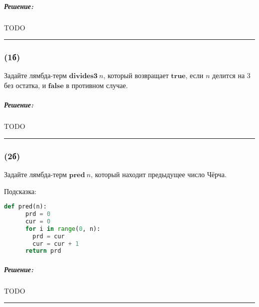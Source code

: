 \documentclass{article}
\newenvironment{proof}{\subparagraph{\hspace{-1em}Решение:\newline}}{\par\noindent\rule{\textwidth}{0.4pt}}
\newcommand{\term}[1]{\mathbf{#1}}
\begin{document}
    \begin{proof}
        TODO %
    \end{proof}

    \subsubsection{(1б)}

    Задайте лямбда-терм $\term{divides3}~n$, который возвращает $\term{true}$, если $n$ делится на 3 без остатка, и $\term{false}$ в противном случае.

    \begin{proof}
        TODO %
    \end{proof}

    \subsubsection{(2б)}

    Задайте лямбда-терм $\term{pred}~n$, который находит предыдущее число Чёрча.

    Подсказка:
    \begin{lstlisting}[language=Python]
    def pred(n):
      prd = 0
      cur = 0
      for i in range(0, n):
        prd = cur
        cur = cur + 1
      return prd
    \end{lstlisting}

    \begin{proof}
        TODO %
    \end{proof}
\end{document}
